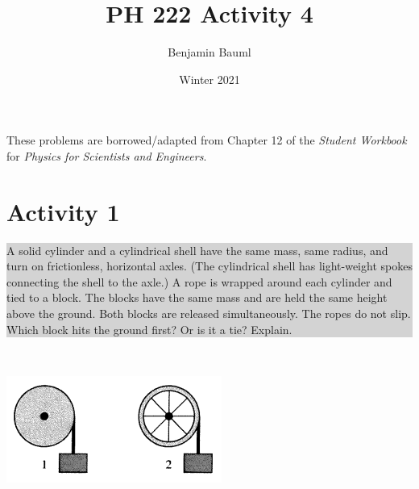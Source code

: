 \documentclass[]{article}
\title{PH 222 Activity 4}
\author{Benjamin Bauml}
\date{Winter 2021}
\newcommand{\excerpt}[1]{\colorbox{lightgray}{\parbox{14.8cm}{#1}} \\}
\begin{document}
\maketitle

\begin{center}
These problems are borrowed/adapted from Chapter 12 of the \textit{Student Workbook} for \textit{Physics for Scientists and Engineers}.
\end{center}
\section*{Activity 1}%
\excerpt{
A solid cylinder and a cylindrical shell have the same mass,
same radius, and turn on frictionless, horizontal axles. (The
cylindrical shell has light-weight spokes connecting the shell
to the axle.) A rope is wrapped around each cylinder and
tied to a block. The blocks have the same mass and are held
the same height above the ground. Both blocks are released
simultaneously. The ropes do not slip.
Which block hits the ground first? Or is it a tie? Explain.
}
\begin{center}
	\includegraphics[scale=0.5]{Cylinders}
\end{center}
\end{document}
